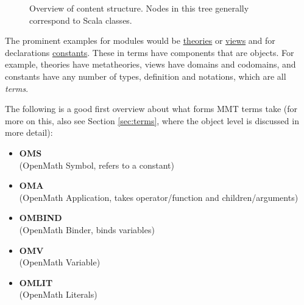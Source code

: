 \documentclass[11pt,a4paper]{article}
\newcommand{\MMT}{\textsf{MMT}\xspace}
\begin{document}
\begin{figure}[h]
\centering
{}
\caption{Overview of content structure. Nodes in this tree generally correspond to Scala classes.}
\label{fig:mmtcontent}
\end{figure}

The prominent examples for modules would be \href{https://uniformal.github.io/doc/language/modules.html#theories}{theories} or \href{https://uniformal.github.io/doc/language/modules.html#views}{views} and for declarations \href{https://uniformal.github.io/doc/language/declarations.html#constants}{constants}. These in terms have components that are objects. For example, theories have metatheories, views have domains and codomains, and constants have any number of types, definition and notations, which are all \emph{terms}.

The following is a good first overview about what forms \MMT terms take (for more on this, also see Section \ref{sec:terms}, where the object level is discussed in more detail):

\begin{itemize}
\item \textbf{OMS}\\ (OpenMath Symbol, refers to a constant)
\item \textbf{OMA}\\ (OpenMath Application, takes operator/function and children/arguments)
\item \textbf{OMBIND}\\ (OpenMath Binder, binds variables)
\item \textbf{OMV}\\ (OpenMath Variable)
\item \textbf{OMLIT}\\ (OpenMath Literals)
\end{itemize}
\end{document}
